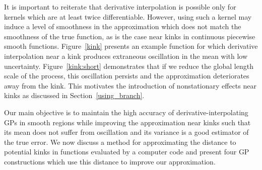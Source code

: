 \documentclass{article}
\numberwithin{equation}{section}
\begin{document}
It is important to reiterate that derivative interpolation is possible only for kernels which are at least twice differentiable. However, using such a kernel may induce a level of smoothness in the approximation which does not match the smoothness of the true function, as is the case near kinks in continuous piecewise smooth functions. Figure~\ref{kink} presents an example function for which derivative interpolation near a kink produces extraneous oscillation in the mean with low uncertainty. Figure~\ref{kink:short} demonstrates that if we reduce the global length scale of the process, this oscillation persists and the approximation deteriorates away from the kink. This motivates the introduction of nonstationary effects near kinks as discussed in Section~\ref{using_branch}.

Our main objective is to maintain the high accuracy of derivative-interpolating GPs in smooth regions while improving the approximation near kinks such that its mean does not suffer from oscillation and its variance is a good estimator of the true error. We now discuss a method for approximating the distance to potential kinks in functions evaluated by a computer code and present four GP constructions which use this distance to improve our approximation.
\end{document}
